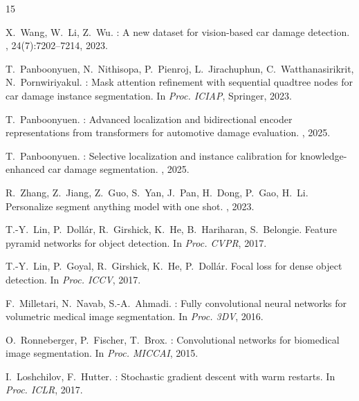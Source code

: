 \documentclass[10pt,twocolumn]{article}
\begin{document}
{\small

\begin{thebibliography}{15}

X.~Wang, W.~Li, Z.~Wu.
: A new dataset for vision-based car damage detection.
, 24(7):7202--7214, 2023.

T.~Panboonyuen, N.~Nithisopa, P.~Pienroj, L.~Jirachuphun, C.~Watthanasirikrit, N.~Pornwiriyakul.
: Mask attention refinement with sequential quadtree nodes for car damage instance segmentation.
\newblock In {\em Proc. ICIAP}, Springer, 2023.

T.~Panboonyuen.
: Advanced localization and bidirectional encoder representations from transformers for automotive damage evaluation.
, 2025.

T.~Panboonyuen.
: Selective localization and instance calibration for knowledge-enhanced car damage segmentation.
, 2025.

R.~Zhang, Z.~Jiang, Z.~Guo, S.~Yan, J.~Pan, H.~Dong, P.~Gao, H.~Li.
\newblock Personalize segment anything model with one shot.
, 2023.

T.-Y.~Lin, P.~Doll\'{a}r, R.~Girshick, K.~He, B.~Hariharan, S.~Belongie.
\newblock Feature pyramid networks for object detection.
\newblock In {\em Proc. CVPR}, 2017.

T.-Y.~Lin, P.~Goyal, R.~Girshick, K.~He, P.~Doll\'{a}r.
\newblock Focal loss for dense object detection.
\newblock In {\em Proc. ICCV}, 2017.

F.~Milletari, N.~Navab, S.-A.~Ahmadi.
: Fully convolutional neural networks for volumetric medical image segmentation.
\newblock In {\em Proc. 3DV}, 2016.

O.~Ronneberger, P.~Fischer, T.~Brox.
: Convolutional networks for biomedical image segmentation.
\newblock In {\em Proc. MICCAI}, 2015.

I.~Loshchilov, F.~Hutter.
: Stochastic gradient descent with warm restarts.
\newblock In {\em Proc. ICLR}, 2017.


\end{thebibliography}}
\end{document}
